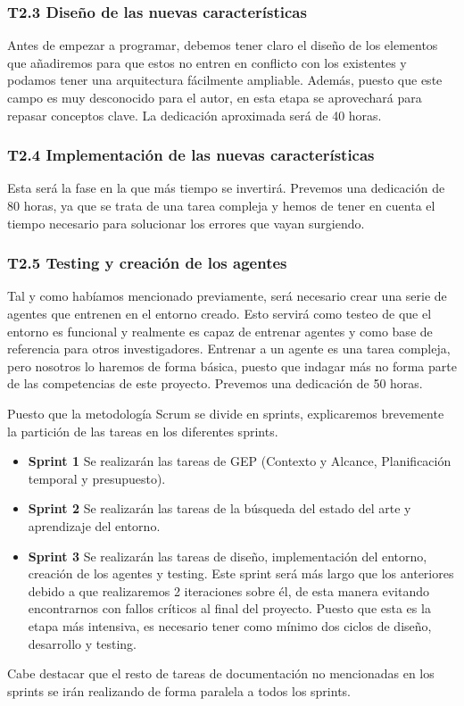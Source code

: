 \subsubsection*{T2.3 Diseño de las nuevas características}
Antes de empezar a programar, debemos tener claro el diseño de los elementos que añadiremos para que estos no entren en conflicto con los existentes y podamos tener una arquitectura fácilmente ampliable. Además, puesto que este campo es muy desconocido para el autor, en esta etapa se aprovechará para repasar conceptos clave. La dedicación aproximada será de 40 horas.

\subsubsection*{T2.4 Implementación de las nuevas características}
Esta será la fase en la que más tiempo se invertirá. Prevemos una dedicación de 80 horas, ya que se trata de una tarea compleja y hemos de tener en cuenta el tiempo necesario para solucionar los errores que vayan surgiendo.

\subsubsection*{T2.5 Testing y creación de los agentes}
Tal y como habíamos mencionado previamente, será necesario crear una serie de agentes que entrenen en el entorno creado. Esto servirá como testeo de que el entorno es funcional y realmente es capaz de entrenar agentes y como base de referencia para otros investigadores. Entrenar a un agente es una tarea compleja, pero nosotros lo haremos de forma básica, puesto que indagar más no forma parte de las competencias de este proyecto. Prevemos una dedicación de 50 horas.  

Puesto que la metodología Scrum se divide en sprints, explicaremos brevemente la partición de las tareas en los diferentes sprints.
\begin{itemize}
    \item \textbf{Sprint 1} Se realizarán las tareas de GEP (Contexto y Alcance, Planificación temporal y presupuesto).
    \item \textbf{Sprint 2} Se realizarán las tareas de la búsqueda del estado del arte y aprendizaje del entorno.
    \item \textbf{Sprint 3} Se realizarán las tareas de diseño, implementación del entorno, creación de los agentes y testing. Este sprint será más largo que los anteriores debido a que realizaremos 2 iteraciones sobre él, de esta manera evitando encontrarnos con fallos críticos al final del proyecto. Puesto que esta es la etapa más intensiva, es necesario tener como mínimo dos ciclos de diseño, desarrollo y testing. 
\end{itemize}
Cabe destacar que el resto de tareas de documentación no mencionadas en los sprints se irán realizando de forma paralela a todos los sprints.

